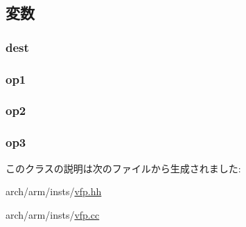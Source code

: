 \subsection{変数}
\hypertarget{classArmISA_1_1FpRegRegRegRegOp_aec72e8e45bdc87abeeeb75d2a8a9a716}{
\subsubsection[{dest}]{ {\bf dest}}}
\label{classArmISA_1_1FpRegRegRegRegOp_aec72e8e45bdc87abeeeb75d2a8a9a716}
\hypertarget{classArmISA_1_1FpRegRegRegRegOp_a4c465c43ad568f8bcf8ae71480e9cfea}{
\subsubsection[{op1}]{ {\bf op1}}}
\label{classArmISA_1_1FpRegRegRegRegOp_a4c465c43ad568f8bcf8ae71480e9cfea}
\hypertarget{classArmISA_1_1FpRegRegRegRegOp_a7799ff6cbe5a252199059eb8665820e7}{
\subsubsection[{op2}]{ {\bf op2}}}
\label{classArmISA_1_1FpRegRegRegRegOp_a7799ff6cbe5a252199059eb8665820e7}
\hypertarget{classArmISA_1_1FpRegRegRegRegOp_aeebae963914149e59062881eccc25c48}{
\subsubsection[{op3}]{ {\bf op3}}}
\label{classArmISA_1_1FpRegRegRegRegOp_aeebae963914149e59062881eccc25c48}


このクラスの説明は次のファイルから生成されました:\begin{DoxyCompactItemize}
\item 
arch/arm/insts/\hyperlink{vfp_8hh}{vfp.hh}\item 
arch/arm/insts/\hyperlink{vfp_8cc}{vfp.cc}\end{DoxyCompactItemize}
